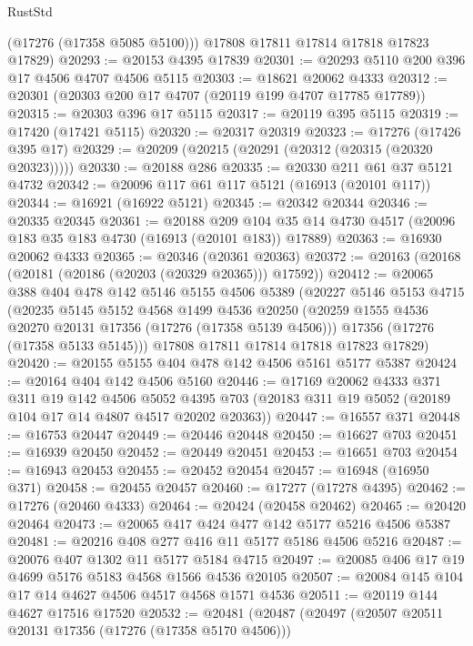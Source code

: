 \begin{lexlean}{RustStd}
\begin{coremodule}
        (@17276 (@17358 @5085 @5100)))
      @17808
      @17811
      @17814
      @17818
      @17823
      @17829)
@20293 := @20153 @4395 @17839
@20301 := @20293 @5110 @200 @396 @17 @4506 @4707 @4506 @5115
@20303 := @18621 @20062 @4333
@20312 := @20301 (@20303 @200 @17 @4707 (@20119 @199 @4707 @17785 @17789))
@20315 := @20303 @396 @17 @5115
@20317 := @20119 @395 @5115
@20319 := @17420 (@17421 @5115)
@20320 := @20317 @20319
@20323 := @17276 (@17426 @395 @17)
@20329 := @20209 (@20215 (@20291 (@20312 (@20315 (@20320 @20323)))))
@20330 := @20188 @286
@20335 := @20330 @211 @61 @37 @5121 @4732
@20342 := @20096 @117 @61 @117 @5121 (@16913 (@20101 @117))
@20344 := @16921 (@16922 @5121)
@20345 := @20342 @20344
@20346 := @20335 @20345
@20361 := @20188
    @209
    @104
    @35
    @14
    @4730
    @4517
    (@20096 @183 @35 @183 @4730 (@16913 (@20101 @183)) @17889)
@20363 := @16930 @20062 @4333
@20365 := @20346 (@20361 @20363)
@20372 := @20163 (@20168 (@20181 (@20186 (@20203 (@20329 @20365))) @17592))
@20412 := @20065
    @388
    @404
    @478
    @142
    @5146
    @5155
    @4506
    @5389
    (@20227
      @5146
      @5153
      @4715
      (@20235
        @5145
        @5152
        @4568
        @1499
        @4536
        @20250
        (@20259 @1555 @4536 @20270 @20131 @17356 (@17276 (@17358 @5139 @4506)))
        @17356
        (@17276 (@17358 @5133 @5145)))
      @17808
      @17811
      @17814
      @17818
      @17823
      @17829)
@20420 := @20155 @5155 @404 @478 @142 @4506 @5161 @5177 @5387
@20424 := @20164 @404 @142 @4506 @5160
@20446 := @17169
    @20062
    @4333
    @371
    @311
    @19
    @142
    @4506
    @5052
    @4395
    @703
    (@20183 @311 @19 @5052 (@20189 @104 @17 @14 @4807 @4517 @20202 @20363))
@20447 := @16557 @371
@20448 := @16753 @20447
@20449 := @20446 @20448
@20450 := @16627 @703
@20451 := @16939 @20450
@20452 := @20449 @20451
@20453 := @16651 @703
@20454 := @16943 @20453
@20455 := @20452 @20454
@20457 := @16948 (@16950 @371)
@20458 := @20455 @20457
@20460 := @17277 (@17278 @4395)
@20462 := @17276 (@20460 @4333)
@20464 := @20424 (@20458 @20462)
@20465 := @20420 @20464
@20473 := @20065 @417 @424 @477 @142 @5177 @5216 @4506 @5387
@20481 := @20216 @408 @277 @416 @11 @5177 @5186 @4506 @5216
@20487 := @20076 @407 @1302 @11 @5177 @5184 @4715
@20497 := @20085 @406 @17 @19 @4699 @5176 @5183 @4568 @1566 @4536 @20105
@20507 := @20084 @145 @104 @17 @14 @4627 @4506 @4517 @4568 @1571 @4536
@20511 := @20119 @144 @4627 @17516 @17520
@20532 := @20481
    (@20487
      (@20497
        (@20507 @20511 @20131 @17356 (@17276 (@17358 @5170 @4506)))

\end{coremodule}
\end{lexlean}
